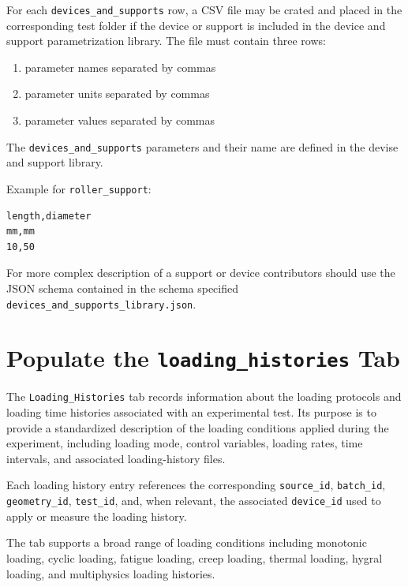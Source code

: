\documentclass[11pt]{book}
\begin{document}
For each \texttt{devices\_and\_supports} row, a CSV file may be crated  and placed in the corresponding test folder if the device or support is included in the device and support parametrization library. The file must contain three rows:

\begin{enumerate}
    \item parameter names separated by commas
    \item parameter units separated by commas
    \item parameter values separated by commas
\end{enumerate}

The \texttt{devices\_and\_supports} parameters and their name are defined in the devise and support library. 


Example for \texttt{roller\_support}:

\begin{verbatim}
length,diameter
mm,mm
10,50
\end{verbatim}

For more complex description of a support or device contributors should use the JSON schema contained in the schema specified \texttt{devices\_and\_supports\_library.json}. 


\section{Populate the \texttt{loading\_histories} Tab}

The \texttt{Loading\_Histories} tab records information about the loading protocols and loading
time histories associated with an experimental test. Its purpose is to provide a standardized
description of the loading conditions applied during the experiment, including loading mode,
control variables, loading rates, time intervals, and associated loading-history files.

Each loading history entry references the corresponding \texttt{source\_id},
\texttt{batch\_id}, \texttt{geometry\_id}, \texttt{test\_id}, and, when relevant,
the associated \texttt{device\_id} used to apply or measure the loading history.

The tab supports a broad range of loading conditions including monotonic loading, cyclic loading,
fatigue loading, creep loading, thermal loading, hygral loading, and multiphysics loading
histories.
\end{document}
